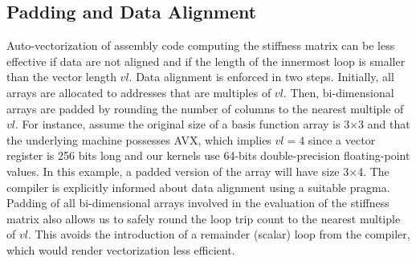 \documentclass[conference]{IEEEtran}
\begin{document}
\subsection{Padding and Data Alignment}
Auto-vectorization of assembly code computing the stiffness matrix can be less effective if data are not aligned and if the length of the innermost loop is smaller than the vector length $vl$. Data alignment is enforced in two steps. Initially, all arrays are allocated to addresses that are multiples of $vl$. Then, bi-dimensional arrays are padded by rounding the number of columns to the nearest multiple of $vl$. For instance, assume the original size of a basis function array is 3$\times$3 and that the underlying machine possesses AVX, which implies $vl=4$ since a vector register is 256 bits long and our kernels use 64-bits double-precision floating-point values. In this example, a padded version of the array will have size 3$\times$4. The compiler is explicitly informed about data alignment using a suitable pragma. Padding of all bi-dimensional arrays involved in the evaluation of the stiffness matrix also allows us to safely round the loop trip count to the nearest multiple of $vl$. This avoids the introduction of a remainder (scalar) loop from the compiler, which would render vectorization less efficient. 

\end{document}
